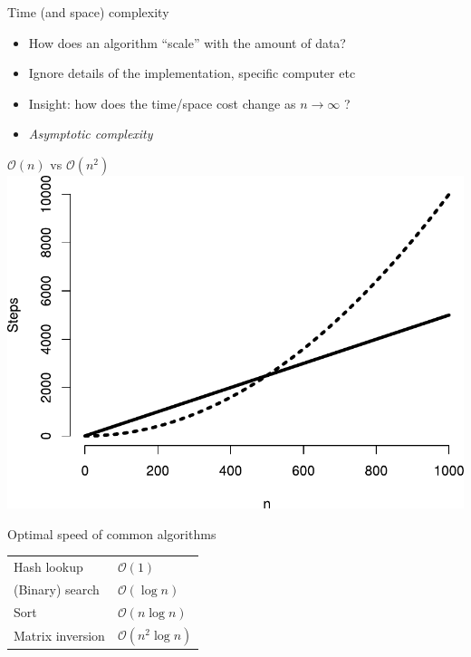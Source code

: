 \documentclass[aspectratio=169,12pt,usepdftitle=false]{beamer} %
\begin{document}
\begin{frame}{Time (and space) complexity}
    \begin{itemize}
	\item How does an algorithm ``scale'' with the amount of data?
	\item Ignore details of the implementation, specific computer etc
	\item Insight: how does the time/space cost change as $n\rightarrow\infty$ ?
	\item \emph{Asymptotic complexity} %
    \end{itemize}
\end{frame}

\begin{frame}{$\mathcal{O}(n)$ vs $\mathcal{O}(n^2)$}
\centering
\includegraphics[height=0.8\textheight]
	{ref/big-o-graph.pdf}
\end{frame}

\begin{frame}{Optimal speed of common algorithms}
\centering
    \begin{tabular}{ll}
	Hash lookup & $\mathcal{O}(1)$ \\
	(Binary) search & $\mathcal{O}(\log{}n)$ \\
	Sort & $\mathcal{O}(n\log{}n)$ \\
	Matrix inversion & $\mathcal{O}(n^2\log{}n)$ \\
    \end{tabular}
\end{frame}
\end{document}
